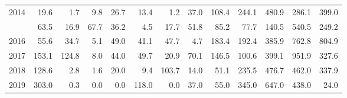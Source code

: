 \documentclass[12pt, a4paper,oneside]{book}
\theoremstyle{definition}
\begin{document}
\begin{table}[!h]
\begin{tabular}[t]{rrrrrrrrrrrrr}
		\rowcolor{gray!6}  2014 & 19.6 & 1.7 & 9.8 & 26.7 & 13.4 & 1.2 & 37.0 & 108.4 & 244.1 & 480.9 & 286.1 & 399.0\\
		\addlinespace
		2015 & 63.5 & 16.9 & 67.7 & 36.2 & 4.5 & 17.7 & 51.8 & 85.2 & 77.7 & 140.5 & 540.5 & 249.2\\
		\rowcolor{gray!6}  2016 & 55.6 & 34.7 & 5.1 & 49.0 & 41.1 & 47.7 & 4.7 & 183.4 & 192.4 & 385.9 & 762.8 & 804.9\\
		2017 & 153.1 & 124.8 & 8.0 & 44.0 & 49.7 & 20.9 & 70.1 & 146.5 & 100.6 & 399.1 & 951.9 & 327.6\\
		\rowcolor{gray!6}  2018 & 128.6 & 2.8 & 1.6 & 20.0 & 9.4 & 103.7 & 14.0 & 51.1 & 235.5 & 476.7 & 462.0 & 337.9\\
		2019 & 303.0 & 0.3 & 0.0 & 0.0 & 118.0 & 0.0 & 37.0 & 55.0 & 345.0 & 647.0 & 438.0 & 24.0\\
		\bottomrule
	\end{tabular}
\end{table}
\clearpage
\end{document}

